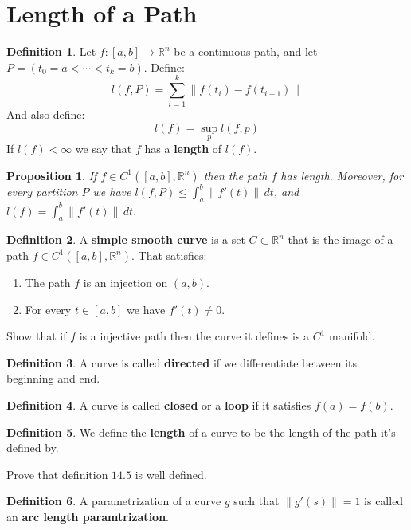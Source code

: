 \documentclass[11pt,a4paper]{article}
\theoremstyle{definition}
\newtheorem{definition}{Definition}[section]
\theoremstyle{plain}
\newtheorem{proposition}[theorem]{Proposition}
\newcommand{\R}{\mathbb{R}}
\begin{document}
	\newpage
	
	\section{Length of a Path}
	\begin{definition}
		Let $f \colon [a,b] \to \R^n$ be a continuous path, and let
		$P = (t_0 = a < \cdots < t_k = b)$. Define:
		\[
			l(f,P) = \sum_{i=1}^{k}{\|f(t_i) - f(t_{i-1})\|}
		\]
		And also define:
		\[
			l(f) = \sup_{p}{l(f,p)}
		\]
		If $l(f) < \infty$ we say that $f$ has a \textbf{length} of
		$l(f)$.
	\end{definition}
	\begin{proposition}
		If $f \in C^1([a,b], \R^n)$ then the path $f$ has length.
		Moreover, for every partition $P$ we have 
		$l(f,P) \le \int_{a}^{b}{\|f'(t)\|\,dt}$, and 
		$l(f) = \int_{a}^{b}{\|f'(t)\|\,dt}$.
	\end{proposition}
	\begin{definition}
		A \textbf{simple smooth curve} is a set $C \subset \R^n$ that
		is the image of a path $f \in C^1([a,b],\R^n)$. That satisfies:
		\begin{enumerate}
			\item The path $f$ is an injection on $(a,b)$.
			\item For every $t \in [a,b]$ we have $f'(t) \neq 0$.
		\end{enumerate}
	\end{definition}
	Show that if $f$ is a injective path then the curve it defines is
	a $C^1$ manifold.
	\begin{definition}
		A curve is called \textbf{directed} if we differentiate between
		its beginning and end.
	\end{definition}
	\begin{definition}
		A curve is called \textbf{closed} or a \textbf{loop} if it
		satisfies $f(a) = f(b)$.
	\end{definition}
	\begin{definition}
		We define the \textbf{length} of a curve to be the length
		of the path it's defined by.
	\end{definition}
	Prove that definition $14.5$ is well defined. \\
	\begin{definition}
		A parametrization of a curve $g$ such that $\|g'(s)\| = 1$
		is called an \textbf{arc length paramtrization}.
	\end{definition}
	
\end{document}
